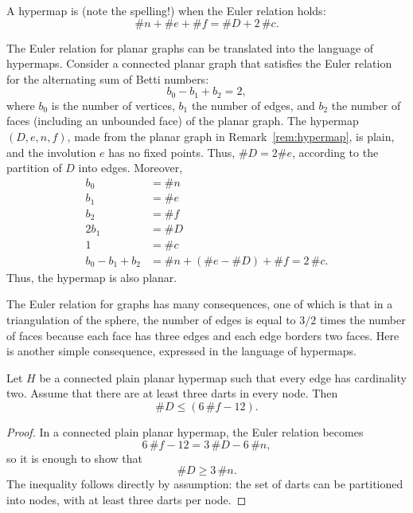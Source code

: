 \begin{definition}[planar]
A hypermap is  (note the
spelling!) when the Euler relation holds:
\[ \# n + \# e + \# f = \# D + 2\, \#c.\] 
%
\end{definition}


\begin{remark}\label{rem:Euler}
The Euler relation for planar graphs can be translated into the
language of hypermaps.  Consider a connected planar graph that
satisfies the Euler relation for the alternating sum of Betti
numbers:
\[ b_0 - b_1 + b_2 = 2,\]  where $b_0$
is the number of vertices, $b_1$ the number of edges, and $b_2$ the
number of faces (including an unbounded face) of the planar
graph. The hypermap $(D,e,n,f)$, made from the planar graph in
Remark~\ref{rem:hypermap}, is plain, and the involution $e$ has no fixed points.  
Thus, $\# D = 2\#e$, according to the partition of $D$ into edges.  Moreover,
\begin{align*}
b_0 &= \# n\\
b_1 &= \# e\\
b_2 &= \# f\\
2b_1 &= \# D\\
1 &= \#c\\
b_0 - b_1 + b_2  &= \# n + (\#e - \#D) + \# f = 2\,\# c.
\end{align*}
Thus, the hypermap is also planar.
\end{remark}


The Euler relation for graphs has many consequences, one of which is
 that in a triangulation of the sphere, the number of
edges is equal to $3/2$ times the number of faces because each face
has three edges and each edge borders two faces.  Here is another simple
consequence, expressed in the language of hypermaps.

\begin{lemma}\label{lemma:dart-upper} 
Let $H$ be a connected plain planar hypermap such that every edge
has cardinality two.  Assume that there are at least three darts in
every node.  Then
\[ 
\# D \le (6\, \#f - 12).
\] 
\end{lemma}
%

\begin{proof}  In a connected plain planar hypermap, the Euler relation becomes
\[ 6\, \#f - 12 = 3\,\#D - 6\,\#n,\] 
so it is enough to show that
\[ 
\# D \ge 3\,\#n.
\] 
The inequality follows directly by assumption: the set of darts can be
partitioned into nodes, with at least three darts per node.
\end{proof}


